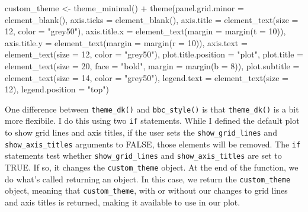 \documentclass[
]{book}
\newenvironment{Shaded}{\begin{snugshade}}{\end{snugshade}}
\newcommand{\AttributeTok}[1]{\textcolor[rgb]{0.77,0.63,0.00}{#1}}
\newcommand{\DecValTok}[1]{\textcolor[rgb]{0.00,0.00,0.81}{#1}}
\newcommand{\FunctionTok}[1]{\textcolor[rgb]{0.00,0.00,0.00}{#1}}
\newcommand{\NormalTok}[1]{#1}
\newcommand{\OtherTok}[1]{\textcolor[rgb]{0.56,0.35,0.01}{#1}}
\newcommand{\SpecialCharTok}[1]{\textcolor[rgb]{0.00,0.00,0.00}{#1}}
\newcommand{\StringTok}[1]{\textcolor[rgb]{0.31,0.60,0.02}{#1}}
\begin{document}
\begin{Shaded}
\begin{Highlighting}[]
\NormalTok{custom\_theme }\OtherTok{\textless{}{-}} \FunctionTok{theme\_minimal}\NormalTok{() }\SpecialCharTok{+}
  \FunctionTok{theme}\NormalTok{(}\AttributeTok{panel.grid.minor =} \FunctionTok{element\_blank}\NormalTok{(),}
        \AttributeTok{axis.ticks =} \FunctionTok{element\_blank}\NormalTok{(),}
        \AttributeTok{axis.title =} \FunctionTok{element\_text}\NormalTok{(}\AttributeTok{size =} \DecValTok{12}\NormalTok{,}
                                  \AttributeTok{color =} \StringTok{"grey50"}\NormalTok{),}
        \AttributeTok{axis.title.x =} \FunctionTok{element\_text}\NormalTok{(}\AttributeTok{margin =} \FunctionTok{margin}\NormalTok{(}\AttributeTok{t =} \DecValTok{10}\NormalTok{)),}
        \AttributeTok{axis.title.y =} \FunctionTok{element\_text}\NormalTok{(}\AttributeTok{margin =} \FunctionTok{margin}\NormalTok{(}\AttributeTok{r =} \DecValTok{10}\NormalTok{)),}
        \AttributeTok{axis.text =} \FunctionTok{element\_text}\NormalTok{(}\AttributeTok{size =} \DecValTok{12}\NormalTok{,}
                                 \AttributeTok{color =} \StringTok{"grey50"}\NormalTok{),}
        \AttributeTok{plot.title.position =} \StringTok{"plot"}\NormalTok{,}
        \AttributeTok{plot.title =} \FunctionTok{element\_text}\NormalTok{(}\AttributeTok{size =} \DecValTok{20}\NormalTok{,}
                                  \AttributeTok{face =} \StringTok{"bold"}\NormalTok{,}
                                  \AttributeTok{margin =} \FunctionTok{margin}\NormalTok{(}\AttributeTok{b =} \DecValTok{8}\NormalTok{)),}
        \AttributeTok{plot.subtitle =} \FunctionTok{element\_text}\NormalTok{(}\AttributeTok{size =} \DecValTok{14}\NormalTok{,}
                                     \AttributeTok{color =} \StringTok{"grey50"}\NormalTok{),}
        \AttributeTok{legend.text =} \FunctionTok{element\_text}\NormalTok{(}\AttributeTok{size =} \DecValTok{12}\NormalTok{),}
        \AttributeTok{legend.position =} \StringTok{"top"}\NormalTok{)}
\end{Highlighting}
\end{Shaded}

One difference between \texttt{theme\_dk()} and \texttt{bbc\_style()} is that \texttt{theme\_dk()} is a bit more flexibile. I do this using two \texttt{if} statements. While I defined the default plot to show grid lines and axis titles, if the user sets the \texttt{show\_grid\_lines} and \texttt{show\_axis\_titles} arguments to FALSE, those elements will be removed. The \texttt{if} statements test whether \texttt{show\_grid\_lines} and \texttt{show\_axis\_titles} are set to TRUE. If so, it changes the \texttt{custom\_theme} object. At the end of the function, we do what's called returning an object. In this case, we return the \texttt{custom\_theme} object, meaning that \texttt{custom\_theme}, with or without our changes to grid lines and axis titles is returned, making it available to use in our plot.
\end{document}
